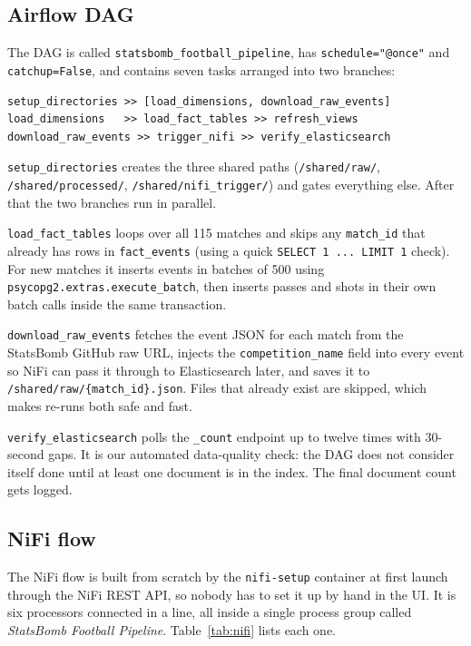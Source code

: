 \documentclass[conference]{IEEEtran}
\begin{document}
\subsection{Airflow DAG}

The DAG is called \texttt{statsbomb\_football\_pipeline}, has
\texttt{schedule="@once"} and \texttt{catchup=False}, and contains seven tasks
arranged into two branches:

\begin{lstlisting}
setup_directories >> [load_dimensions, download_raw_events]
load_dimensions   >> load_fact_tables >> refresh_views
download_raw_events >> trigger_nifi >> verify_elasticsearch
\end{lstlisting}

\texttt{setup\_directories} creates the three shared paths
(\texttt{/shared/raw/}, \texttt{/shared/processed/},
\texttt{/shared/nifi\_trigger/}) and gates everything else. After that the two
branches run in parallel.

\texttt{load\_fact\_tables} loops over all 115 matches and skips any
\texttt{match\_id} that already has rows in \texttt{fact\_events} (using a
quick \texttt{SELECT 1 ... LIMIT 1} check). For new matches it inserts events
in batches of 500 using \texttt{psycopg2.extras.execute\_batch}, then inserts
passes and shots in their own batch calls inside the same transaction.

\texttt{download\_raw\_events} fetches the event JSON for each match from the
StatsBomb GitHub raw URL, injects the \texttt{competition\_name} field into
every event so NiFi can pass it through to Elasticsearch later, and saves it
to \texttt{/shared/raw/\{match\_id\}.json}. Files that already exist are
skipped, which makes re-runs both safe and fast.

\texttt{verify\_elasticsearch} polls the \texttt{\_count} endpoint up to twelve
times with 30-second gaps. It is our automated data-quality check: the DAG
does not consider itself done until at least one document is in the index.
The final document count gets logged.

\subsection{NiFi flow}

The NiFi flow is built from scratch by the \texttt{nifi-setup} container at
first launch through the NiFi REST API, so nobody has to set it up by hand in
the UI. It is six processors connected in a line, all inside a single process
group called \textit{StatsBomb Football Pipeline}. Table~\ref{tab:nifi} lists
each one.
\end{document}
